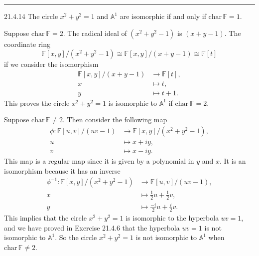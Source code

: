 \documentclass[letterpaper, 12pt]{article}
\begin{document}
\noindent\rule{7in}{2.8pt}
\begin{problem}{21.4.14}
The circle \(x^2+y^2=1\) and \(\mathbb{A}^1\) are isomorphic if and only if \(\text{char}\, \mathbb{F}=1\).
\end{problem}
\begin{solution}
Suppose \(\text{char}\ \mathbb{F}=2\). The radical ideal of \((x^2+y^2-1)\) is \((x+y-1)\). The coordinate ring 
\[\mathbb{F}[x,y]/(x^2+y^2-1)\cong \mathbb{F}[x,y]/(x+y-1)\cong \mathbb{F}[t]\]
if we consider the isomorphism 
\begin{align*}
    \mathbb{F}[x,y]/(x+y-1)&\rightarrow \mathbb{F}[t],\\ 
    x&\mapsto t,\\ 
    y&\mapsto t+1.
\end{align*}
This proves the circle \(x^2+y^2=1\) is isomorphic to \(\mathbb{A}^1\) if \(\text{char}\ \mathbb{F}=2\). 

Suppose \(\text{char}\, \mathbb{F}\neq 2\). Then consider the following map 
\begin{align*}
    \phi:\mathbb{F}[u,v]/(uv-1)&\rightarrow \mathbb{F}[x,y]/(x^2+y^2-1),\\ 
    u&\mapsto x+iy,\\ 
    v&\mapsto x-iy. 
\end{align*}
This map is a regular map since it is given by a polynomial in \(y\) and \(x\). It is an isomorphism because it has an inverse 
\begin{align*}
    \phi^{-1}:\mathbb{F}[x,y]/(x^2+y^2-1)&\rightarrow \mathbb{F}[u,v]/(uv-1),\\ 
    x&\mapsto \frac{1}{2}u+\frac{1}{2}v,\\ 
    y&\mapsto \frac{-i}{2}u+\frac{i}{2}v.
\end{align*}
This implies that the circle \(x^2+y^2=1\) is isomorphic to the hyperbola \(uv=1\), and we have proved in Exercise 21.4.6 that the hyperbola \(uv=1\) is not isomorphic to \(\mathbb{A}^1\). So the circle \(x^2+y^2=1\) is not isomorphic to \(\mathbb{A}^1\) when \(\text{char}\, \mathbb{F}\neq 2\). 
\end{solution}
\end{document}
